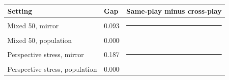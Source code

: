 \begin{tabular}{lll}
\toprule
Setting & Gap & Same-play minus cross-play \\
\midrule
Mixed 50, mirror & 0.093 & \rule{0.93cm}{6pt} \\
Mixed 50, population & 0.000 &  \\
Perspective stress, mirror & 0.187 & \rule{1.87cm}{6pt} \\
Perspective stress, population & 0.000 &  \\
\bottomrule
\end{tabular}
